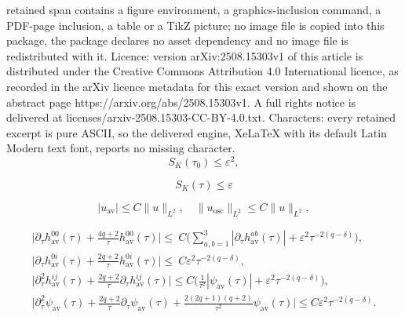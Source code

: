 \documentclass[10pt,a4paper]{amsart}
\newcommand{\av}{\mathrm{av}}
\newcommand{\osc}{\mathrm{osc}}
\newcommand{\pa}{\partial}
\newcommand{\ve}{\varepsilon}
\begin{document}
retained span contains a figure environment, a graphics-inclusion command, a PDF-page inclusion, a table or a TikZ picture; no image file is copied into this package, the package declares no asset dependency and no image file is redistributed with it. Licence: version arXiv:2508.15303v1 of this article is distributed under the Creative Commons Attribution 4.0 International licence, as recorded in the arXiv licence metadata for this exact version and shown on the abstract page https://arxiv.org/abs/2508.15303v1. A full rights notice is delivered at licenses/arxiv-2508.15303-CC-BY-4.0.txt. Characters: every retained excerpt is pure ASCII, so the delivered engine, XeLaTeX with its default Latin Modern text font, reports no missing character.
        \begin{equation}\label{sec:gaugedeqs.eq:bounddata}
        S_K(\tau_0) \leq \ve^2,
        \end{equation}

\begin{equation}\label{sec:globex.eq:bootstrap}
    S_K(\tau) \leq \ve
\end{equation}

\begin{equation}\label{sec:avgsys.eq:avgbound}
    |u_\av| \leq C\|u\|_{L^2},\quad \|u_{\osc}\|_{L^2}\leq C\|u\|_{L^2},
\end{equation}

\begin{subequations}\label{sec:avgsys.eq:odeavg2}
    \begin{gather}
        \Big|\pa_\tau  h_{\av}^{00}(\tau) + \frac{4q+2}{\tau}h_{\av}^{00}(\tau)\Big| \leq\> C\Big(\sum_{a,b=1}^3|\pa_\tau h_{\av}^{ab}(\tau)| + \ve^2 \tau^{-2(q-\delta)}\Big),\label{sec:avgsys.eq:odeavglapse2}\\
        \Big|\pa_\tau   h_{\av}^{0i}(\tau) + \frac{2q+2}{\tau}  h_{\av}^{0i}(\tau)\Big| \leq\> C\ve^2\tau^{-2(q-\delta)},\label{sec:avgsys.eq:odeavgshift2}\\
        \Big|\pa_\tau^2 h_{\av}^{ij}(\tau) + \frac{2q+2}{\tau}\pa_\tau  h_{\av}^{ij}(\tau)\Big| \leq C\Big(\frac{1}{\tau^2}|\psi_{\av}(\tau)| + \ve^2\tau^{-2(q-\delta)}\Big),\label{sec:avgsys.eq:odeavghori2}\\
        \Big|\pa_\tau^2 \psi_{\av}(\tau) + \frac{2q+2}{\tau}\pa_\tau \psi_{\av}(\tau) + \frac{2(2q+1)(q+2)}{\tau^2}\psi_{\av}(\tau)\Big| \leq C\ve^2\tau^{-2(q-\delta)}.\label{sec:avgsys.eq:odeavgscalar2}
    \end{gather}
\end{subequations}
\end{document}
